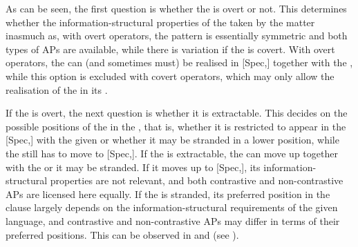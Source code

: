 \ea \upshape \label{treeoperators5}
\z

As can be seen, the first question is whether the  is overt or not. This determines whether the information-structural properties of the  taken by the  matter inasmuch as, with overt operators, the pattern is essentially symmetric and both types of APs are available, while there is variation if the  is covert. With overt operators, the  can (and sometimes must) be realised in [Spec,] together with the , while this option is excluded with covert operators, which may only allow the realisation of the  in its .

If the  is overt, the next question is whether it is extractable. This decides on the possible positions of the  in the , that is, whether it is restricted to appear in the [Spec,] with the given  or whether it may be stranded in a lower position, while the  still has to move to [Spec,]. If the  is extractable, the  can move up together with the  or it may be stranded. If it moves up to [Spec,], its information-structural properties are not relevant, and both contrastive and non-contrastive APs are licensed here equally. If the  is stranded, its preferred position in the clause largely depends on the information-structural requirements of the given language, and contrastive and non-contrastive APs may differ in terms of their preferred positions. This can be observed in  and  (see ).


